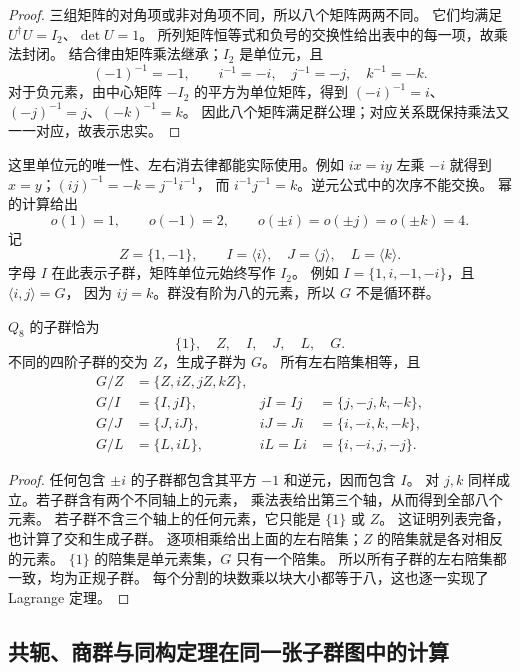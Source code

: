 \begin{proof}
三组矩阵的对角项或非对角项不同，所以八个矩阵两两不同。
它们均满足 $U^\dagger U=I_2$、$\det U=1$。
所列矩阵恒等式和负号的交换性给出表中的每一项，故乘法封闭。
结合律由矩阵乘法继承；$I_2$ 是单位元，且
\[
(-1)^{-1}=-1,\qquad i^{-1}=-i,\quad j^{-1}=-j,\quad k^{-1}=-k.
\]
对于负元素，由中心矩阵 $-I_2$ 的平方为单位矩阵，得到
$(-i)^{-1}=i$、$(-j)^{-1}=j$、$(-k)^{-1}=k$。
因此八个矩阵满足群公理；对应关系既保持乘法又一一对应，故表示忠实。
\end{proof}

这里单位元的唯一性、左右消去律都能实际使用。例如 $ix=iy$ 左乘
$-i$ 就得到 $x=y$；$(ij)^{-1}=-k=j^{-1}i^{-1}$，
而 $i^{-1}j^{-1}=k$。逆元公式中的次序不能交换。
幂的计算给出
\[
o(1)=1,\qquad o(-1)=2,\qquad
o(\pm i)=o(\pm j)=o(\pm k)=4.
\]
记
\[
Z=\{1,-1\},\qquad I=\langle i\rangle,
\quad J=\langle j\rangle,\quad L=\langle k\rangle.
\]
字母 $I$ 在此表示子群，矩阵单位元始终写作 $I_2$。
例如 $I=\{1,i,-1,-i\}$，且 $\langle i,j\rangle=G$，
因为 $ij=k$。群没有阶为八的元素，所以 $G$ 不是循环群。

\begin{proposition}[全部子群与陪集]
\label{prop:q8-subgroups-cosets}
$Q_8$ 的子群恰为
\[
\{1\},\quad Z,\quad I,\quad J,\quad L,\quad G.
\]
不同的四阶子群的交为 $Z$，生成子群为 $G$。
所有左右陪集相等，且
\[
\begin{aligned}
G/Z&=\{Z,iZ,jZ,kZ\},\\
G/I&=\{I,jI\},& jI=Ij&=\{j,-j,k,-k\},\\
G/J&=\{J,iJ\},& iJ=Ji&=\{i,-i,k,-k\},\\
G/L&=\{L,iL\},& iL=Li&=\{i,-i,j,-j\}.
\end{aligned}
\]
\end{proposition}

\begin{proof}
任何包含 $\pm i$ 的子群都包含其平方 $-1$ 和逆元，因而包含 $I$。
对 $j,k$ 同样成立。若子群含有两个不同轴上的元素，
乘法表给出第三个轴，从而得到全部八个元素。
若子群不含三个轴上的任何元素，它只能是 $\{1\}$ 或 $Z$。
这证明列表完备，也计算了交和生成子群。
逐项相乘给出上面的左右陪集；$Z$ 的陪集就是各对相反的元素。
$\{1\}$ 的陪集是单元素集，$G$ 只有一个陪集。
所以所有子群的左右陪集都一致，均为正规子群。
每个分割的块数乘以块大小都等于八，这也逐一实现了 Lagrange 定理。
\end{proof}

\subsection{共轭、商群与同构定理在同一张子群图中的计算}

